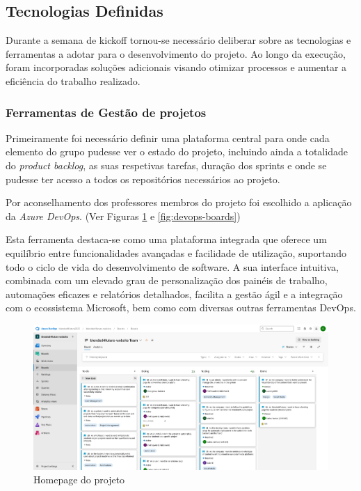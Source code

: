 \subsection{Tecnologias Definidas}

Durante a semana de kickoff tornou-se necessário deliberar sobre as tecnologias e ferramentas a adotar para o desenvolvimento do projeto. Ao longo da execução, foram incorporadas soluções adicionais visando otimizar processos e aumentar a eficiência do trabalho realizado.

\subsubsection{Ferramentas de Gestão de projetos}

Primeiramente foi necessário definir uma plataforma central para onde cada elemento do grupo pudesse ver o estado do projeto, incluindo ainda a totalidade do \textit{product backlog}, as suas respetivas tarefas, duração dos sprints e onde se pudesse ter acesso a todos os repositórios necessários ao projeto.

Por aconselhamento dos professores membros do projeto foi escolhido a aplicação da \textit{Azure DevOps}. (Ver Figuras \ref{fig:devops-homepage} e \ref{fig:devops-boards})

Esta ferramenta destaca-se como uma plataforma integrada que oferece um equilíbrio entre funcionalidades avançadas e facilidade de utilização, suportando todo o ciclo de vida do desenvolvimento de software. A sua interface intuitiva, combinada com um elevado grau de personalização dos painéis de trabalho, automações eficazes e relatórios detalhados, facilita a gestão ágil e a integração com o ecossistema Microsoft, bem como com diversas outras ferramentas DevOps. 

\begin{figure}[h!tbp]
    \includegraphics[width=\linewidth]{capitulos/cap1-introducao/imagens/ferramentas/devops-homepage.png}
    \caption{Homepage do projeto}
    \label{fig:devops-homepage}
\end{figure}

